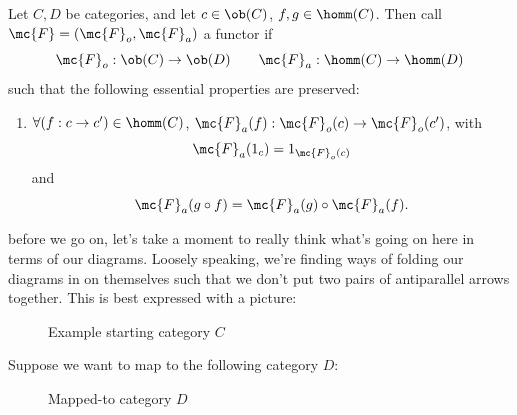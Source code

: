 \documentclass{fkbook}
\theoremstyle{snazzydefinition}
\begin{document}
\begin{definition}[Functor]
  Let $C, D$ be categories, and let $c \in \ob(C)$, $f,g \in
  \homm(C)$. Then call $\mc{F} = (\mc{F}_o, \mc{F}_a)$ a functor if
  \[
    \mc{F}_o : \ob(C) \to \ob(D) \qquad \mc{F}_a : \homm(C) \to
    \homm(D)
  \]
  such that the following essential properties are preserved:
  \begin{enumerate}
    \item $\forall (f : c \to c') \in \homm(C)$, $\mc{F}_a(f) :
      \mc{F}_o(c) \to \mc{F}_o(c')$, with
      \[
        \mc{F}_a(1_{c}) = 1_{\mc{F}_o(c)}
      \]
      and
      \[
        \mc{F}_a(g \circ f) = \mc{F}_a(g) \circ \mc{F}_a(f).
      \]
  \end{enumerate}
\end{definition}
before we go on, let's take a moment to really think what's going on
here in terms of our diagrams. Loosely speaking, we're finding ways of
folding our diagrams in on themselves such that we don't put two pairs
of antiparallel arrows together. This is best expressed with a
picture:
\begin{figure}[H]
  \centering
  \caption{Example starting category $C$}
\end{figure}
Suppose we want to map to the following category $D$:
\begin{figure}[H]
  \centering
  \caption{Mapped-to category $D$}
\end{figure}
\end{document}

